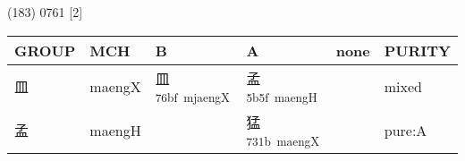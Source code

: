 \documentclass[14pt,a4paper]{scrartcl}
\begin{document}
(183) 0761 {[}2{]}

\begin{longtable}[c]{@{}llllll@{}}
\toprule
\begin{minipage}[b]{0.14\columnwidth}\raggedright\strut
GROUP
\strut\end{minipage} &
\begin{minipage}[b]{0.14\columnwidth}\raggedright\strut
MCH
\strut\end{minipage} &
\begin{minipage}[b]{0.14\columnwidth}\raggedright\strut
B
\strut\end{minipage} &
\begin{minipage}[b]{0.14\columnwidth}\raggedright\strut
A
\strut\end{minipage} &
\begin{minipage}[b]{0.14\columnwidth}\raggedright\strut
none
\strut\end{minipage} &
\begin{minipage}[b]{0.14\columnwidth}\raggedright\strut
PURITY
\strut\end{minipage}\tabularnewline
\midrule
\endhead
\begin{minipage}[t]{0.14\columnwidth}\raggedright\strut
皿
\strut\end{minipage} &
\begin{minipage}[t]{0.14\columnwidth}\raggedright\strut
maengX
\strut\end{minipage} &
\begin{minipage}[t]{0.14\columnwidth}\raggedright\strut
皿\textsuperscript{76bf~mjaengX}
\strut\end{minipage} &
\begin{minipage}[t]{0.14\columnwidth}\raggedright\strut
孟\textsuperscript{5b5f~maengH}
\strut\end{minipage} &
\begin{minipage}[t]{0.14\columnwidth}\raggedright\strut
\strut\end{minipage} &
\begin{minipage}[t]{0.14\columnwidth}\raggedright\strut
mixed
\strut\end{minipage}\tabularnewline
\begin{minipage}[t]{0.14\columnwidth}\raggedright\strut
孟
\strut\end{minipage} &
\begin{minipage}[t]{0.14\columnwidth}\raggedright\strut
maengH
\strut\end{minipage} &
\begin{minipage}[t]{0.14\columnwidth}\raggedright\strut
\strut\end{minipage} &
\begin{minipage}[t]{0.14\columnwidth}\raggedright\strut
猛\textsuperscript{731b~maengX}
\strut\end{minipage} &
\begin{minipage}[t]{0.14\columnwidth}\raggedright\strut
\strut\end{minipage} &
\begin{minipage}[t]{0.14\columnwidth}\raggedright\strut
pure:A
\strut\end{minipage}\tabularnewline
\bottomrule
\end{longtable}
\end{document}
